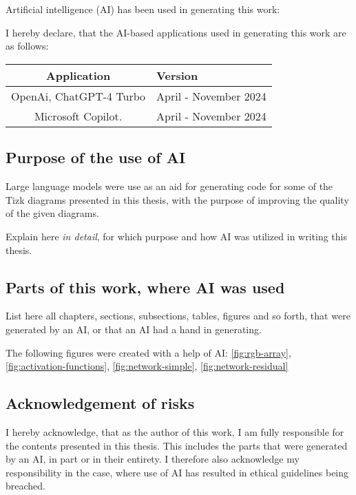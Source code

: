 \clearpage
\chapter*{\@aidisclaimertitle}
Artificial intelligence (AI) has been used in generating this work:


I hereby declare, that the AI-based applications used in generating this work are as follows:

\begin{center}
    \begin{tabular}{c|l}
        \toprule
        \textbf{Application} & \textbf{Version} \\
        \midrule
        OpenAi, ChatGPT-4 Turbo & April - November 2024 \\
        Microsoft Copilot. & April - November 2024 \\
        \bottomrule
    \end{tabular}
\end{center}

\section*{Purpose of the use of AI}

Large language models were use as an aid for generating code for some of the Tizk diagrams presented in this thesis, with the purpose of improving the quality of the given diagrams.

Explain here \emph{in detail}, for which purpose and how AI was utilized in writing this thesis.

\section*{Parts of this work,  where AI was used}

List here all chapters, sections, subsections, tables, figures and so forth,
that were generated by an AI, or that an AI had a hand in generating.

The following figures were created with a help of AI: \ref{fig:rgb-array}, \ref{fig:activation-functions}, \ref{fig:network-simple}, \ref{fig:network-residual}

\section*{Acknowledgement of risks}

I hereby acknowledge, that as the author of this work, I am fully
responsible for the contents presented in this thesis. This includes
the parts that were generated by an AI, in part or in their entirety. I
therefore also acknowledge my responsibility in the case, where use of
AI has resulted in ethical guidelines being breached.

\clearpage
